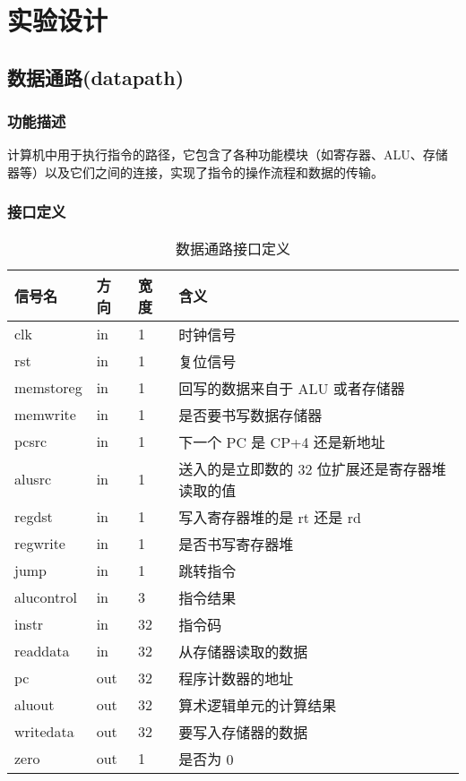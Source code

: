 \section{实验设计}
\subsection{数据通路(datapath)}\label{sub:datapath}
\subsubsection{功能描述}
计算机中用于执行指令的路径，它包含了各种功能模块（如寄存器、ALU、存储器等）以及它们之间的连接，实现了指令的操作流程和数据的传输。
\subsubsection{接口定义}
\begin{table}[htp]
	\caption{数据通路接口定义}\label{tab:datapathdef}
	\begin{center}
		\begin{tabular}{|l|l|l|p{8cm}|}
		\hline
		\textbf{信号名} & \textbf{方向} & \textbf{宽度} & \textbf{含义}\\ \hline \hline
		clk         & in  & 1  & 时钟信号 \\ 
		rst         & in  & 1  & 复位信号 \\ 
		memstoreg   & in  & 1  & 回写的数据来自于 ALU 或者存储器 \\ 
		memwrite    & in  & 1  & 是否要书写数据存储器 \\ 
		pcsrc       & in  & 1  & 下一个 PC 是 CP+4 还是新地址 \\ 
		alusrc      & in  & 1  & 送入的是立即数的 32 位扩展还是寄存器堆读取的值 \\ 
		regdst      & in  & 1  & 写入寄存器堆的是 rt 还是 rd \\ 
		regwrite    & in  & 1  & 是否书写寄存器堆 \\ 
		jump        & in  & 1  & 跳转指令 \\ 
		alucontrol  & in  & 3  & 指令结果 \\ 
		instr       & in  & 32 & 指令码 \\ 
		readdata    & in  & 32 & 从存储器读取的数据 \\ 
		pc          & out & 32 & 程序计数器的地址 \\ 
		aluout      & out & 32 & 算术逻辑单元的计算结果 \\ 
		writedata   & out & 32 & 要写入存储器的数据 \\ 
		zero        & out & 1  & 是否为 0 \\ 
		\hline
		\end{tabular}
	\end{center}
	\end{table}
